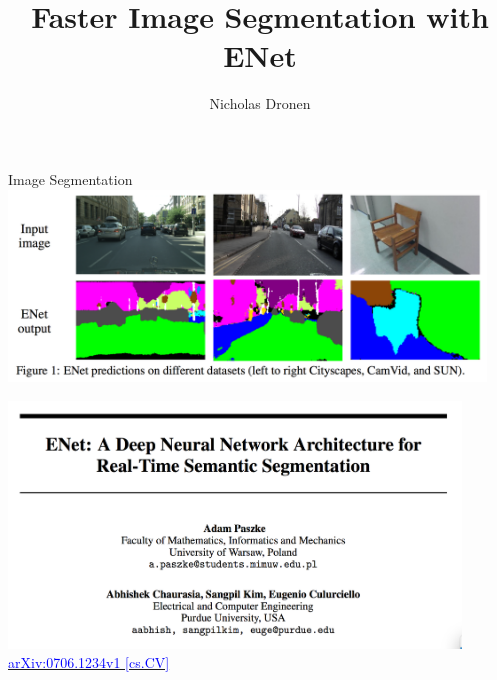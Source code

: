 \documentclass[]{beamer}
\begin{document}

\title{Faster Image Segmentation with ENet}
\author{Nicholas Dronen}

\begin{frame}
\maketitle
\end{frame}

%
%
%

\begin{frame}{Image Segmentation}
\centering
\includegraphics[width=0.95\textwidth]{figures/segmentation} \\
\end{frame}

\begin{frame}
\centering
\includegraphics[width=0.9\textwidth]{figures/enet-title} \\
\href{https://arxiv.org/abs/1606.02147}{\textcolor{blue}{arXiv:0706.1234v1 [cs.CV]}}
\end{frame}
\end{document}
